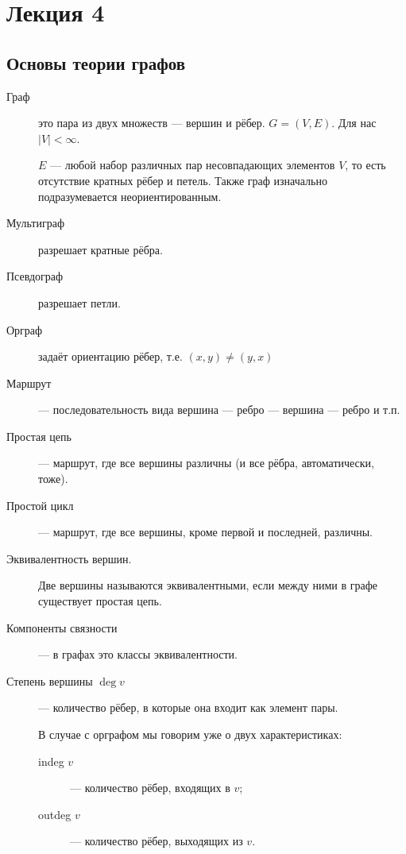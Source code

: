 
\chapter{Лекция 4}

\section{Основы теории графов}

\begin{description}
\item[Граф] это пара из двух множеств --- вершин и рёбер. $ G = (V,E)$. Для нас $ |V| < \infty $.

$E $  --- любой набор различных пар несовпадающих элементов $V$, то есть отсутствие кратных рёбер и петель. Также граф изначально подразумевается неориентированным. 

\item[Мультиграф] разрешает кратные рёбра.
\item[Псевдограф] разрешает петли.
\item[Орграф] задаёт ориентацию рёбер, т.е. $(x,y) \neq (y,x) $

\item[Маршрут] --- последовательность вида вершина --- ребро --- вершина --- ребро и т.п. 
\item[Простая цепь]  ---  маршрут, где все вершины различны (и все рёбра, автоматически, тоже).
\item[Простой цикл] --- маршрут, где все вершины, кроме первой и последней, различны.
\item[Эквивалентность вершин.] Две вершины называются эквивалентными, если между ними в графе существует простая цепь.
\item[Компоненты связности] --- в графах это классы эквивалентности.
\item[Степень вершины $\deg v$] --- количество рёбер, в которые она входит как элемент пары.

В случае с орграфом мы говорим уже о двух характеристиках:

\begin{description}

\item[indeg $v$] --- количество рёбер, входящих в $v$;

\item[outdeg $v$] --- количество рёбер, выходящих из $v$.

\end{description}


\end{description}
